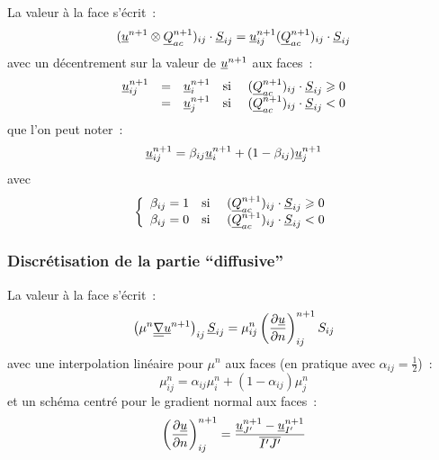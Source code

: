 La valeur à la face s'écrit~:
\begin{equation}
(\underline{u}^{n+1} \otimes \underline{Q}_{ac}^{n+1})_{ij}\cdot \underline{S}_{ij}
= \underline{u}_{ij}^{n+1}(\underline{Q}_{ac}^{n+1})_{ij} \cdot \underline{S}_{ij}
\end{equation}
avec un décentrement sur la valeur de $\underline{u}^{n+1}$ aux faces~:
\begin{equation}
\begin{array}{lllll}
\underline{u}_{ij}^{n+1}
& = & \underline{u}_i^{n+1}
& \text{si\ } & (\underline{Q}_{ac}^{n+1})_{ij} \cdot \underline{S}_{ij} \geqslant 0 \\
& = & \underline{u}_j^{n+1}
& \text{si\ } & (\underline{Q}_{ac}^{n+1})_{ij} \cdot \underline{S}_{ij} < 0 \\
\end{array}
\end{equation}
que l'on peut noter~:
\begin{equation}
\underline{u}_{ij}^{n+1}
 = \beta_{ij}\underline{u}_i^{n+1} + (1-\beta_{ij})\underline{u}_j^{n+1}
\end{equation}
avec
\begin{equation}
\left\{\begin{array}{lll}
\beta_{ij} = 1 & \text{si\ }
& (\underline{Q}_{ac}^{n+1})_{ij} \cdot \underline{S}_{ij} \geqslant 0 \\
\beta_{ij} = 0 & \text{si\ }
& (\underline{Q}_{ac}^{n+1})_{ij} \cdot \underline{S}_{ij} < 0 \\
\end{array}\right.
\end{equation}

\subsubsection*{Discrétisation de la partie ``diffusive''}

La valeur à la face s'écrit~:
\begin{equation}
\left(\mu^n\underline{\underline{{\nabla}}}{\underline{u}^{n+1}}\right)_{ij}\underline{S}_{ij}
= \mu_{ij}^n
\displaystyle \left( \frac{\partial \underline{u}}{\partial n} \right)^{n+1}_{ij}
S_{ij}
\end{equation}
avec une interpolation linéaire pour $\mu^n$ aux faces (en pratique avec
$\alpha_{ij}=\frac{1}{2}$)~:
\begin{equation}
\mu_{ij}^n
= \alpha_{ij}\mu_{i}^n+(1-\alpha_{ij})\mu_{j}^n
\end{equation}
et un schéma centré pour le gradient normal aux faces~:
\begin{equation}
\displaystyle \left( \frac{\partial \underline{u}}{\partial n} \right)^{n+1}_{ij}
= \displaystyle\frac{\underline{u}_{J'}^{n+1}-\underline{u}_{I'}^{n+1}}{\overline{I'J'}}
\end{equation}

